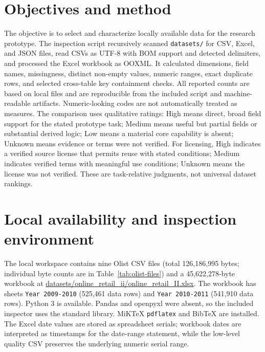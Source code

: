 \documentclass[11pt,a4paper]{article}
\begin{document}
\section{Objectives and method}
The objective is to select and characterize locally available data for the research prototype. The inspection script recursively scanned \texttt{datasets/} for CSV, Excel, and JSON files, read CSVs as UTF-8 with BOM support and detected delimiters, and processed the Excel workbook as OOXML. It calculated dimensions, field names, missingness, distinct non-empty values, numeric ranges, exact duplicate rows, and selected cross-table key containment checks. All reported counts are based on local files and are reproducible from the included script and machine-readable artifacts. Numeric-looking codes are not automatically treated as measures. The comparison uses qualitative ratings: High means direct, broad field support for the stated prototype task; Medium means useful but partial fields or substantial derived logic; Low means a material core capability is absent; Unknown means evidence or terms were not verified. For licensing, High indicates a verified source license that permits reuse with stated conditions; Medium indicates verified terms with meaningful use conditions; Unknown means the license was not verified. These are task-relative judgments, not universal dataset rankings.

\section{Local availability and inspection environment}
The local workspace contains nine Olist CSV files (total 126,186,995 bytes; individual byte counts are in Table~\ref{tab:olist-files}) and a 45,622,278-byte workbook at \url{datasets/online_retail_ii/online_retail_II.xlsx}. The workbook has sheets \texttt{Year 2009-2010} (525,461 data rows) and \texttt{Year 2010-2011} (541,910 data rows). Python 3 is available. Pandas and openpyxl were absent, so the included inspector uses the standard library. MiKTeX \texttt{pdflatex} and BibTeX are installed. The Excel date values are stored as spreadsheet serials; workbook dates are interpreted as timestamps for the date-range statement, while the low-level quality CSV preserves the underlying numeric serial range.
\end{document}

